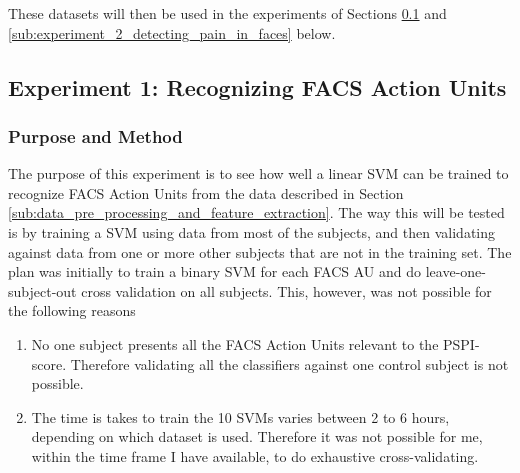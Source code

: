 \documentclass[Main]{subfiles}
\begin{document}
			These datasets will then be used in the experiments of Sections \ref{sub:experiment_1_recognizing_facs_action_units} and \ref{sub:experiment_2_detecting_pain_in_faces} below.
			
		

	\subsection{Experiment 1: Recognizing FACS Action Units} %
		\label{sub:experiment_1_recognizing_facs_action_units}
		\subsubsection{Purpose and Method} %
			\label{ssub:purpose_and_method_ex1}
			The purpose of this experiment is to see how well a linear SVM can be trained to recognize FACS Action Units from the data described in Section \ref{sub:data_pre_processing_and_feature_extraction}.
			The way this will be tested is by training a SVM using data from most of the subjects, and then validating against data from one or more other subjects that are not in the training set.
			The plan was initially to train a binary SVM for each FACS AU and do leave-one-subject-out cross validation on all subjects.
			This, however, was not possible for the following reasons
			\begin{enumerate}
				\item
				No one subject presents all the FACS Action Units relevant to the PSPI-score.
				Therefore validating all the classifiers against one control subject is not possible.

				\item
				The time is takes to train the 10 SVMs varies between 2 to 6 hours, depending on which dataset is used.
				Therefore it was not possible for me, within the time frame I have available, to do exhaustive cross-validating.
			\end{enumerate}
\end{document}

